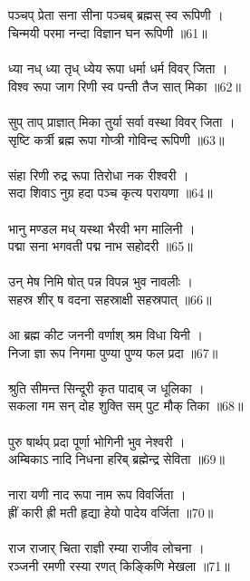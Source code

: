 \subsection{}
पञ्चप् प्रेता सना सीना पञ्चब् ब्रह्मस् स्व रूपिणी ।\\
चिन्मयी परमा नन्दा विज्ञान घन रूपिणी ॥61॥\\
\\
ध्या नध् ध्या तृध् ध्येय रूपा धर्मा धर्म विवर् जिता ।\\
विश्व रूपा जाग रिणी स्व पन्ती तैज सात् मिका ॥62॥\\
\\
सुप् ताप् प्राज्ञात् मिका तुर्या सर्वा वस्था विवर् जिता ।\\
सृष्टि कर्त्री ब्रह्म रूपा गोप्त्री गोविन्द रूपिणी ॥63॥\\
\\
संहा रिणी रुद्र रूपा तिरोधा नक रीश्वरी ।\\
सदा शिवाऽ नुग्र हदा पञ्च कृत्य परायणा ॥64॥\\
\\
भानु मण्डल मध् यस्था भैरवी भग मालिनी ।\\
पद्मा सना भगवती पद्म नाभ सहोदरी ॥65॥\\
\\
उन् मेष निमि षोत् पन्न विपन्न भुव नावलीः ।\\
सहस्र शीर् ष वदना सहस्राक्षी सहस्रपात् ॥66॥\\
\\
आ ब्रह्म कीट जननी वर्णाश् श्रम विधा यिनी ।\\
निजा ज्ञा रूप निगमा पुण्या पुण्य फल प्रदा ॥67॥\\
\\
श्रुति सीमन्त सिन्दूरी कृत पादाब् ज धूलिका ।\\
सकला गम सन् दोह शुक्ति सम् पुट मौक् तिका ॥68॥\\
\\
पुरु षार्थप् प्रदा पूर्णा भोगिनी भुव नेश्वरी ।\\
अम्बिकाऽ नादि निधना हरिब् ब्रह्मेन्द्र सेविता ॥69॥\\
\\
नारा यणी नाद रूपा नाम रूप विवर्जिता ।\\
ह्रीं कारी ह्री मती हृद्या हेयो पादेय वर्जिता ॥70॥\\
\\
राज राजार् चिता राज्ञी रम्या राजीव लोचना ।\\
रञ्जनी रमणी रस्या रणत् किङ्किणि मेखला ॥71॥\\
\\
